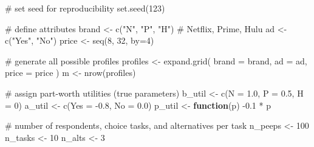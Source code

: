 \documentclass[
  letterpaper,
  DIV=11,
  numbers=noendperiod]{scrartcl}
\newenvironment{Shaded}{\begin{snugshade}}{\end{snugshade}}
\newcommand{\AttributeTok}[1]{\textcolor[rgb]{0.40,0.45,0.13}{#1}}
\newcommand{\CommentTok}[1]{\textcolor[rgb]{0.37,0.37,0.37}{#1}}
\newcommand{\ControlFlowTok}[1]{\textcolor[rgb]{0.00,0.23,0.31}{\textbf{#1}}}
\newcommand{\DecValTok}[1]{\textcolor[rgb]{0.68,0.00,0.00}{#1}}
\newcommand{\FloatTok}[1]{\textcolor[rgb]{0.68,0.00,0.00}{#1}}
\newcommand{\FunctionTok}[1]{\textcolor[rgb]{0.28,0.35,0.67}{#1}}
\newcommand{\NormalTok}[1]{\textcolor[rgb]{0.00,0.23,0.31}{#1}}
\newcommand{\OtherTok}[1]{\textcolor[rgb]{0.00,0.23,0.31}{#1}}
\newcommand{\SpecialCharTok}[1]{\textcolor[rgb]{0.37,0.37,0.37}{#1}}
\newcommand{\StringTok}[1]{\textcolor[rgb]{0.13,0.47,0.30}{#1}}
\begin{document}
\begin{tcolorbox}[enhanced jigsaw, breakable, colback=white, opacitybacktitle=0.6, opacityback=0, bottomrule=.15mm, toptitle=1mm, arc=.35mm, coltitle=black, title=\textcolor{quarto-callout-note-color}{\faInfo}\hspace{0.5em}{Note}, colframe=quarto-callout-note-color-frame, bottomtitle=1mm, titlerule=0mm, rightrule=.15mm, left=2mm, toprule=.15mm, colbacktitle=quarto-callout-note-color!10!white, leftrule=.75mm]

\begin{Shaded}
\begin{Highlighting}[]
\CommentTok{\# set seed for reproducibility}
\FunctionTok{set.seed}\NormalTok{(}\DecValTok{123}\NormalTok{)}

\CommentTok{\# define attributes}
\NormalTok{brand }\OtherTok{\textless{}{-}} \FunctionTok{c}\NormalTok{(}\StringTok{"N"}\NormalTok{, }\StringTok{"P"}\NormalTok{, }\StringTok{"H"}\NormalTok{) }\CommentTok{\# Netflix, Prime, Hulu}
\NormalTok{ad }\OtherTok{\textless{}{-}} \FunctionTok{c}\NormalTok{(}\StringTok{"Yes"}\NormalTok{, }\StringTok{"No"}\NormalTok{)}
\NormalTok{price }\OtherTok{\textless{}{-}} \FunctionTok{seq}\NormalTok{(}\DecValTok{8}\NormalTok{, }\DecValTok{32}\NormalTok{, }\AttributeTok{by=}\DecValTok{4}\NormalTok{)}

\CommentTok{\# generate all possible profiles}
\NormalTok{profiles }\OtherTok{\textless{}{-}} \FunctionTok{expand.grid}\NormalTok{(}
    \AttributeTok{brand =}\NormalTok{ brand,}
    \AttributeTok{ad =}\NormalTok{ ad,}
    \AttributeTok{price =}\NormalTok{ price}
\NormalTok{)}
\NormalTok{m }\OtherTok{\textless{}{-}} \FunctionTok{nrow}\NormalTok{(profiles)}

\CommentTok{\# assign part{-}worth utilities (true parameters)}
\NormalTok{b\_util }\OtherTok{\textless{}{-}} \FunctionTok{c}\NormalTok{(}\AttributeTok{N =} \FloatTok{1.0}\NormalTok{, }\AttributeTok{P =} \FloatTok{0.5}\NormalTok{, }\AttributeTok{H =} \DecValTok{0}\NormalTok{)}
\NormalTok{a\_util }\OtherTok{\textless{}{-}} \FunctionTok{c}\NormalTok{(}\AttributeTok{Yes =} \SpecialCharTok{{-}}\FloatTok{0.8}\NormalTok{, }\AttributeTok{No =} \FloatTok{0.0}\NormalTok{)}
\NormalTok{p\_util }\OtherTok{\textless{}{-}} \ControlFlowTok{function}\NormalTok{(p) }\SpecialCharTok{{-}}\FloatTok{0.1} \SpecialCharTok{*}\NormalTok{ p}

\CommentTok{\# number of respondents, choice tasks, and alternatives per task}
\NormalTok{n\_peeps }\OtherTok{\textless{}{-}} \DecValTok{100}
\NormalTok{n\_tasks }\OtherTok{\textless{}{-}} \DecValTok{10}
\NormalTok{n\_alts }\OtherTok{\textless{}{-}} \DecValTok{3}


\end{Highlighting}
\end{Shaded}
\end{tcolorbox}
\end{document}
